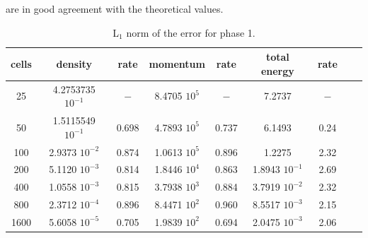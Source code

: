 \documentclass[preprint,10pt]{elsarticle}
\begin{document}
are in good agreement with the theoretical values.
%
\begin{table}[H]
\begin{center}
 \caption{\label{tbl:l1-norm-indp-phase-1} L$_1$ norm of the error for phase 1.}
 \begin{tabular}{|c|c|c|c|c|c|c|c|c|}
 \hline
cells & density         & rate   & momentum        & rate    & total energy         & rate     \\ \hline
25      & 4.2753735 $10^{-1}$ & $-$    & 8.4705 $10^{5}$ & $-$     & 7.2737           & $-$      \\ \hline
50      & 1.5115549 $10^{-1}$ & 0.698 & 4.7893 $10^{5}$ & 0.737 & 6.1493           & 0.24 \\ \hline
100    & 2.9373 $10^{-2}$ & 0.874 & 1.0613 $10^{5}$ & 0.896  & 1.2275           & 2.32   \\ \hline
200    & 5.1120 $10^{-3}$ & 0.814 & 1.8446 $10^{4}$ & 0.863  & 1.8943 $10^{-1}$ & 2.69   \\ \hline
400    & 1.0558 $10^{-3}$ & 0.815 & 3.7938 $10^{3}$ & 0.884  & 3.7919 $10^{-2}$ & 2.32   \\ \hline
800    & 2.3712 $10^{-4}$ & 0.896 & 8.4471 $10^{2}$ & 0.960  & 8.5517 $10^{-3}$ & 2.15   \\ \hline
1600  & 5.6058 $10^{-5}$ & 0.705 & 1.9839 $10^{2}$ & 0.694  & 2.0475 $10^{-3}$ & 2.06   \\ \hline
\end{tabular}
\end{center}
\end{table}
%
\end{document}
